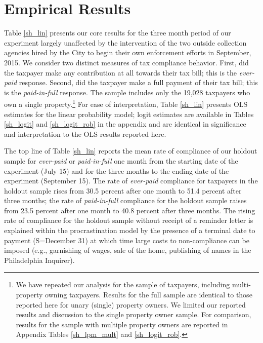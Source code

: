 \documentclass[12pt]{article}
\begin{document}
\section{Empirical Results}

Table \ref{sh_lin} presents our core results for the three month
period of our experiment largely unaffected by the intervention of the
two outside collection agencies hired by the City to begin their own
enforcement efforts in September, 2015. We consider two distinct
measures of tax compliance behavior. First, did the taxpayer make any
contribution at all towards their tax bill; this is the
\textit{ever-paid} response. Second, did the taxpayer make a full
payment of their tax bill; this is the \textit{paid-in-full}
response. The sample includes only the 19,028 taxpayers who own a
single property.\footnote{We have repeated our analysis for the sample
  of taxpayers, including multi-property owning taxpayers. Results
  for the full sample are identical to those reported here for unary
  (single) property owners. We limited our reported results and
  discussion to the single property owner sample. For comparison,
  results for the sample with multiple property owners are reported in
  Appendix Tables \ref{sh_lpm_mult} and \ref{sh_logit_rob}.} For ease
of interpretation, Table \ref{sh_lin} presents OLS estimates for the
linear probability model; logit estimates are available in Tables
\ref{sh_logit} and \ref{sh_logit_rob} in the appendix and are
identical in significance and interpretation to the OLS results
reported here.

The top line of Table \ref{sh_lin} reports the mean rate of compliance
of our holdout sample for \textit{ever-paid} or \textit{paid-in-full}
one month from the starting date of the experiment (July 15) and for
the three months to the ending date of the experiment (September
15). The rate of \textit{ever-paid} compliance for taxpayers in the
holdout sample rises from 30.5 percent after one month to 51.4 percent
after three months; the rate of \textit{paid-in-full} compliance for
the holdout sample raises from 23.5 percent after one month to 40.8
percent after three months. The rising rate of compliance for the
holdout sample without receipt of a reminder letter is explained
within the  procrastination model by the presence of a
terminal date to payment (S=December 31) at which time large costs to
non-compliance can be imposed (e.g., garnishing of wages, sale of the
home, publishing of names in the Philadelphia Inquirer).
\end{document}
